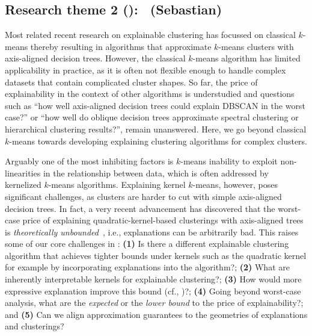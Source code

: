 \documentclass[a4paper,11pt]{article}
\begin{document}

\subsection*{Research theme 2 (\rtw): \clusterings\ {\color{teal}(Sebastian)}}

Most related recent research on explainable clustering has focussed on classical $k$-means
thereby resulting in algorithms that approximate $k$-means clusters with axis-aligned decision trees.
However, the classical $k$-means algorithm has limited applicability in practice, as it is often not flexible enough to handle complex datasets that contain complicated cluster shapes.
So far, the price of explainability in the context of other algorithms is understudied and questions such as ``how well axis-aligned decision trees could explain DBSCAN in the worst case?'' or ``how well do oblique decision trees approximate spectral clustering or hierarchical clustering results?'', remain unanswered.
Here, we go beyond classical $k$-means towards developing explaining clustering algorithms for complex clusters.

Arguably one of the most inhibiting factors is $k$-means inability to exploit non-linearities in the relationship between data, which is often addressed by kernelized $k$-means algorithms.
Explaining kernel $k$-means, however, poses significant challenges, as clusters are harder to cut with simple axis-aligned decision trees. 
In fact, a very recent advancement has discovered that the worst-case price of explaining quadratic-kernel-based clusterings with axis-aligned trees is \emph{theoretically unbounded}~\cite{}, i.e., explanations can be arbitrarily bad. 
This raises some of our core challenges in \rtw:
\textbf{(1)} Is there a different explainable clustering algorithm that achieves tighter bounds under kernels such as the quadratic kernel for example by incorporating explanations into the algorithm?;
\textbf{(2)} What are inherently interpretable kernels for explainable clustering?;
\textbf{(3)} How would more expressive explanation improve this bound (cf., \rto)?;
\textbf{(4)} Going beyond worst-case analysis, what are the \emph{expected} or the \emph{lower bound} to the price of explainability?; and
\textbf{(5)} Can we align approximation guarantees to the geometries of explanations and clusterings?
\end{document}
